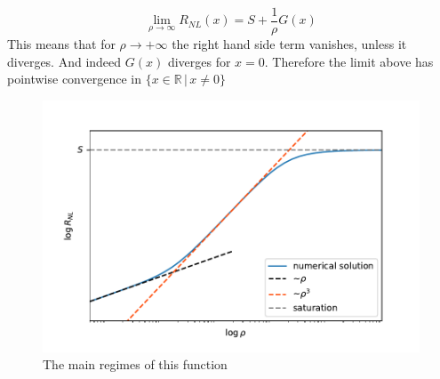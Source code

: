 \begin{equation}
    \lim_{\rho\to\infty} R_{NL}(x)=S + \frac 1\rho G(x)
\end{equation}
This means that for $\rho\to +\infty$ the right hand side term vanishes, unless it diverges. And indeed $G(x)$ diverges for $x=0$. Therefore the limit above has pointwise convergence in $\{x\in \mathbb R\,|\,x\neq 0\}$
\begin{figure}[h!]
    \centering
    \includegraphics[width=\linewidth]{Immagini/rnl/all_approx_rho.pdf}
    \caption{The main regimes of this function}
    \label{fig:all_approx_rho}
\end{figure}\\
